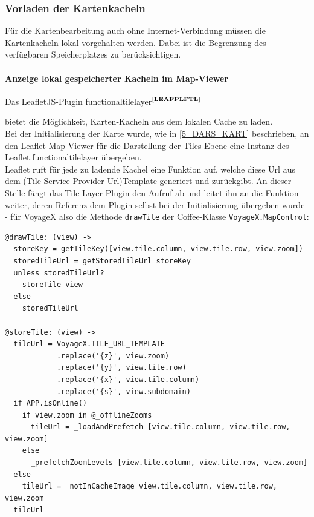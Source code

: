 \subsubsection{Vorladen der Kartenkacheln}
Für die Kartenbearbeitung auch ohne Internet-Verbindung müssen die Kartenkacheln 
lokal vorgehalten werden. Dabei ist die Begrenzung des verfügbaren Speicherplatzes zu berücksichtigen.

\paragraph{Anzeige lokal gespeicherter Kacheln im Map-Viewer}
Das LeafletJS-Plugin functionaltilelayer$^{\textbf{\ref{LEAFPLFTL}}}$
\addtocounter{footnote}{1}%
%
bietet die Möglichkeit, Karten-Kacheln aus dem lokalen Cache zu laden.\\
Bei der Initialisierung der Karte wurde, wie in \ref{5_DARS_KART} beschrieben, an den Leaflet-Map-Viewer für die Darstellung der Tiles-Ebene eine Instanz des Leaflet.functionaltilelayer übergeben.\\
Leaflet ruft für jede zu ladende Kachel eine Funktion auf, welche diese Url aus dem (Tile-Service-Provider-Url)Template generiert und zurückgibt. An dieser Stelle fängt das Tile-Layer-Plugin den Aufruf ab und leitet
ihn an die Funktion weiter, deren Referenz dem Plugin selbst bei der Initialisierung übergeben wurde - für VoyageX also die Methode \texttt{drawTile} der Coffee-Klasse \texttt{VoyageX.MapControl}:
\lstset{language=CoffeeScript}
\begin{lstlisting}[frame=single,xleftmargin=0pt]
@drawTile: (view) ->
  storeKey = getTileKey([view.tile.column, view.tile.row, view.zoom])
  storedTileUrl = getStoredTileUrl storeKey
  unless storedTileUrl?
    storeTile view
  else
    storedTileUrl

@storeTile: (view) ->
  tileUrl = VoyageX.TILE_URL_TEMPLATE
            .replace('{z}', view.zoom)
            .replace('{y}', view.tile.row)
            .replace('{x}', view.tile.column)
            .replace('{s}', view.subdomain)
  if APP.isOnline()
    if view.zoom in @_offlineZooms
   	  tileUrl = _loadAndPrefetch [view.tile.column, view.tile.row, view.zoom]
    else
      _prefetchZoomLevels [view.tile.column, view.tile.row, view.zoom]
  else
    tileUrl = _notInCacheImage view.tile.column, view.tile.row, view.zoom
  tileUrl
\end{lstlisting}%
